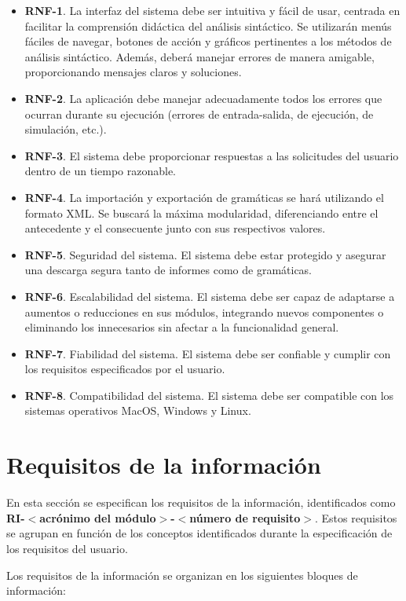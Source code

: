 \begin{itemize}
    \item \textbf{RNF-1}. La interfaz del sistema debe ser intuitiva y fácil de usar, centrada en facilitar la comprensión didáctica del análisis sintáctico. Se utilizarán menús fáciles de navegar, botones de acción y gráficos pertinentes a los métodos de análisis sintáctico. Además, deberá manejar errores de manera amigable, proporcionando mensajes claros y soluciones.
    \item \textbf{RNF-2}. La aplicación debe manejar adecuadamente todos los errores que ocurran durante su ejecución (errores de entrada-salida, de ejecución, de simulación, etc.).
    \item \textbf{RNF-3}. El sistema debe proporcionar respuestas a las solicitudes del usuario dentro de un tiempo razonable.
    \item \textbf{RNF-4}. La importación y exportación de gramáticas se hará utilizando el formato XML. Se buscará la máxima modularidad, diferenciando entre el antecedente y el consecuente junto con sus respectivos valores.
    \item \textbf{RNF-5}. Seguridad del sistema. El sistema debe estar protegido y asegurar una descarga segura tanto de informes como de gramáticas.
    \item \textbf{RNF-6}. Escalabilidad del sistema. El sistema debe ser capaz de adaptarse a aumentos o reducciones en sus módulos, integrando nuevos componentes o eliminando los innecesarios sin afectar a la funcionalidad general.
    \item \textbf{RNF-7}. Fiabilidad del sistema. El sistema debe ser confiable y cumplir con los requisitos especificados por el usuario.
    \item \textbf{RNF-8}. Compatibilidad del sistema. El sistema debe ser compatible con los sistemas operativos MacOS, Windows y Linux.
\end{itemize}


\section{Requisitos de la información}

En esta sección se especifican los requisitos de la información, identificados como \textbf{RI-$<$acrónimo del módulo$>$-$<$número de requisito$>$}. Estos requisitos se agrupan en función de los conceptos identificados durante la especificación de los requisitos del usuario.

Los requisitos de la información se organizan en los siguientes bloques de información:

